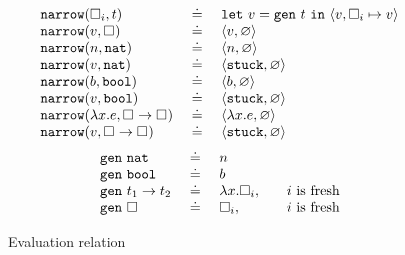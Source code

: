 \begin{figure}
$$
\begin{array}{lcl}
\mathtt{narrow}(\square_{i}, t) & \ \doteq\  & \mathtt{let}\ v = \mathtt{gen}\ t\ \mathtt{in}\ \langle v, \square_{i} \mapsto v \rangle \\
\mathtt{narrow}(v, \square_{})  & \ \doteq\  & \langle v, \varnothing \rangle \\
\mathtt{narrow}(n, \mathtt{nat})    & \ \doteq\  & \langle n, \varnothing \rangle \\
\mathtt{narrow}(v, \mathtt{nat})    & \ \doteq\  & \langle \mathtt{stuck}, \varnothing \rangle \\
\mathtt{narrow}(b, \mathtt{bool})   & \ \doteq\  & \langle b, \varnothing \rangle \\
\mathtt{narrow}(v, \mathtt{bool})   & \ \doteq\  & \langle \mathtt{stuck}, \varnothing \rangle \\
\mathtt{narrow}(\lambda x. e, {\square_{}} \rightarrow \square_{}) & \ \doteq\  & \langle \lambda x. e, \varnothing \rangle \\
\mathtt{narrow}(v, {\square_{}} \rightarrow \square_{}) & \ \doteq\  & \langle \mathtt{stuck}, \varnothing \rangle \\
\end{array}
$$
$$
\begin{array}{lcll}
\mathtt{gen}\ \mathtt{nat}   & \ \doteq\  & n & \\
\mathtt{gen}\ \mathtt{bool}  & \ \doteq\  & b & \\
\mathtt{gen}\ {t_1} \rightarrow t_2 & \ \doteq\  & \lambda x. \square_{i}, & \quad \text{$i$ is fresh} \\
\mathtt{gen}\ \square_{} & \ \doteq\  & \square_{i}, & \quad \text{$i$ is fresh} \\
\end{array}
$$


\caption{Evaluation relation}
\label{fig:evaluation}
\end{figure}
